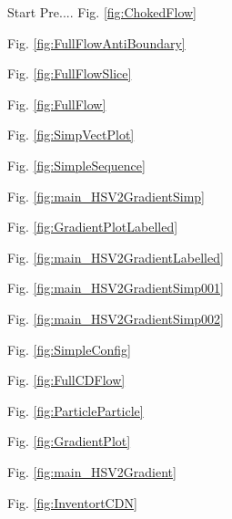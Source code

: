 \newpage 
 \clearpage 
 
Start Pre....
\hfill
\break
\newline
Fig. \ref{fig:ChokedFlow}

Fig. \ref{fig:FullFlowAntiBoundary}

Fig. \ref{fig:FullFlowSlice}

Fig. \ref{fig:FullFlow}

Fig. \ref{fig:SimpVectPlot}

Fig. \ref{fig:SimpleSequence}

Fig. \ref{fig:main_HSV2GradientSimp}

Fig. \ref{fig:GradientPlotLabelled}

Fig. \ref{fig:main_HSV2GradientLabelled}

Fig. \ref{fig:main_HSV2GradientSimp001}

Fig. \ref{fig:main_HSV2GradientSimp002}

Fig. \ref{fig:SimpleConfig}

Fig. \ref{fig:FullCDFlow}

Fig. \ref{fig:ParticleParticle}

Fig. \ref{fig:GradientPlot}

Fig. \ref{fig:main_HSV2Gradient}

Fig. \ref{fig:InventortCDN}

